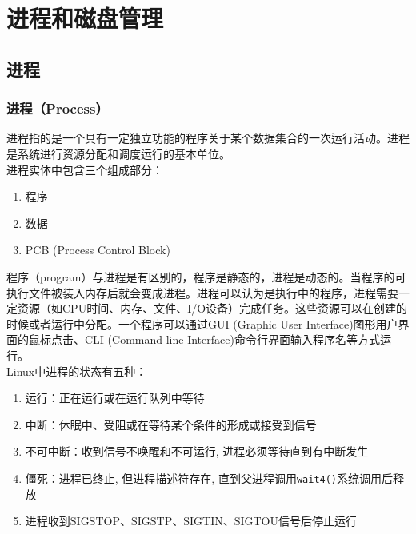 \documentclass[12pt, openany, oneside]{book}
\begin{document}
\newpage

\chapter{进程和磁盘管理}

\section{进程}

\subsection{进程（Process）}

进程指的是一个具有一定独立功能的程序关于某个数据集合的一次运行活动。进程是系统进行资源分配和调度运行的基本单位。 \\

进程实体中包含三个组成部分：

\begin{enumerate}
	\item 程序
	\item 数据
	\item PCB (Process Control Block)
\end{enumerate}

程序（program）与进程是有区别的，程序是静态的，进程是动态的。当程序的可执行文件被装入内存后就会变成进程。进程可以认为是执行中的程序，进程需要一定资源（如CPU时间、内存、文件、I/O设备）完成任务。这些资源可以在创建的时候或者运行中分配。一个程序可以通过GUI (Graphic User Interface)图形用户界面的鼠标点击、CLI (Command-line Interface)命令行界面输入程序名等方式运行。 \\

Linux中进程的状态有五种：

\begin{enumerate}
	\item 运行：正在运行或在运行队列中等待

	\item 中断：休眠中、受阻或在等待某个条件的形成或接受到信号

	\item 不可中断：收到信号不唤醒和不可运行, 进程必须等待直到有中断发生

	\item 僵死：进程已终止, 但进程描述符存在, 直到父进程调用\lstinline|wait4()|系统调用后释放

	\item 进程收到SIGSTOP、SIGSTP、SIGTIN、SIGTOU信号后停止运行
\end{enumerate}
\end{document}
